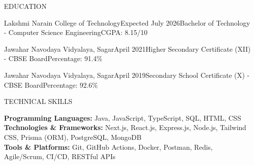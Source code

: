 \documentclass{resume}
\begin{document}
\begin{rSection}{EDUCATION}

\begin{rEducation}{Lakshmi Narain College of Technology}{Expected July 2026}{Bachelor of Technology - Computer Science Engineering}{CGPA: 8.15/10}
\end{rEducation}

\begin{rEducation}{Jawahar Navodaya Vidyalaya, Sagar}{April 2021}{Higher Secondary Certificate (XII) - CBSE Board}{Percentage: 91.4\%}
\end{rEducation}

\begin{rEducation}{Jawahar Navodaya Vidyalaya, Sagar}{April 2019}{Secondary School Certificate (X) - CBSE Board}{Percentage: 92.6\%}
\end{rEducation}

\end{rSection}

\begin{rSection}{TECHNICAL SKILLS}

\textbf{Programming Languages:} Java, JavaScript, TypeScript, SQL, HTML, CSS \\[2pt]
\textbf{Technologies \& Frameworks:} Next.js, React.js, Express.js, Node.js, Tailwind CSS, Prisma (ORM), PostgreSQL, MongoDB \\[2pt]
\textbf{Tools \& Platforms:} Git, GitHub Actions, Docker, Postman, Redis, Agile/Scrum, CI/CD, RESTful APIs

\end{rSection}
\end{document}
